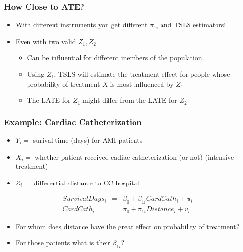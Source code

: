 \begin{frame}
\frametitle{How Close to ATE?}
\begin{itemize}
\item With different instruments you get different $\pi_{1i}$ and TSLS estimators!
\item Even with two valid $Z_1, Z_2$
\begin{itemize}
\item Can be influential for different members of the population.
\item Using $Z_1$, TSLS will estimate the treatment effect for people whose probability of treatment $X$ is most influenced by $Z_1$
\item The LATE for $Z_1$ might differ from the LATE for $Z_2$
\end{itemize}
\end{itemize}
\end{frame}


\begin{frame}
\frametitle{Example: Cardiac Catheterization}
\begin{itemize}
\item $Y_i=$ surival time (days) for AMI patients
\item $X_i=$ whether patient received cadiac catheterization (or not) (intensive treatment)
\item $Z_i=$ differential distance to CC hospital
\end{itemize}
\begin{eqnarray*}
SurvivalDays_i &=& \beta_0 + \beta_{1i} CardCath_i + u_i\\
CardCath_i &=& \pi_0 + \pi_{1i} Distance_i + v_i
\end{eqnarray*}
\begin{itemize}
\item For whom does distance have the great effect on probability of treatment?
\item For those patients what is their $\beta_{1i}$?
\end{itemize}
\end{frame}


